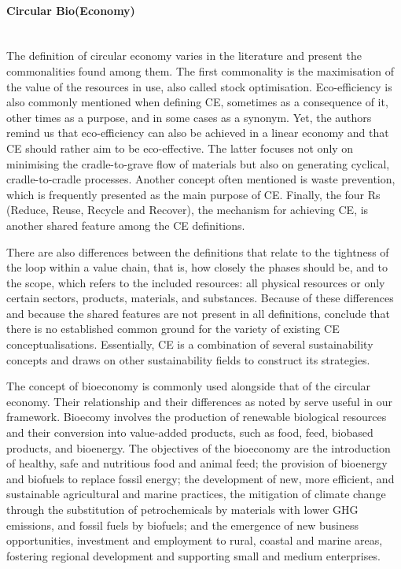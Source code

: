 \paragraph{Circular Bio(Economy)} \mbox{}\\
 The definition of circular economy varies in the literature and \cite{kalmykova2018circular} present the commonalities found among them. The first commonality is the maximisation of the value of the resources in use, also called stock optimisation. Eco-efficiency is also commonly mentioned when defining CE, sometimes as a consequence of it, other times as a purpose, and in some cases as a synonym. Yet, the authors remind us that eco-efficiency can also be achieved in a linear economy and that CE should rather aim to be eco-effective. The latter focuses not only on minimising the cradle-to-grave flow of materials but also on generating cyclical, cradle-to-cradle processes. Another concept often mentioned is waste prevention, which is frequently presented as the main purpose of CE. Finally, the four Rs (Reduce, Reuse, Recycle and Recover), the mechanism for achieving CE, is another shared feature among the CE definitions. 

There are also differences between the definitions that relate to the tightness of the loop within a value chain, that is, how closely the phases should be, and to the scope, which refers to the included resources: all physical resources or only certain sectors, products, materials, and substances. Because of these differences and because the shared features are not present in all definitions, \citeauthor{kalmykova2018circular} conclude that there is no established common ground for the variety of existing CE conceptualisations. Essentially, CE is a combination of several sustainability concepts and draws on other sustainability fields to construct its strategies. 

The concept of bioeconomy is commonly used alongside that of the circular economy. Their relationship and their differences as noted by \cite{carus2018circular} serve useful in our framework. Bioecomy involves the production of renewable biological resources and their conversion into value-added products, such as food, feed, biobased products, and bioenergy. The objectives of the bioeconomy are the introduction of healthy, safe and nutritious food and animal feed; the provision of bioenergy and biofuels to replace fossil energy; the development of new, more efficient, and sustainable agricultural and marine practices, the mitigation of climate change through the substitution of petrochemicals by materials with lower GHG emissions, and fossil fuels by biofuels; and the emergence of new business opportunities, investment and employment to rural, coastal and marine areas, fostering regional development and supporting small and medium enterprises.

